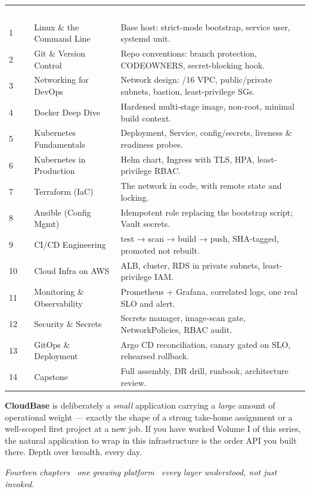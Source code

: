 \begin{center}\footnotesize
\wbrowcolors
\begin{tabularx}{\linewidth}{@{}C{7mm}L{38mm}X@{}}
\textcolor{white}{\textbf{Day}} & \textcolor{white}{\textbf{Topic}} & \textcolor{white}{\textbf{CloudBase milestone you build}}\\
1 & Linux \& the Command Line & Base host: strict-mode bootstrap, service user, systemd unit.\\
2 & Git \& Version Control & Repo conventions: branch protection, CODEOWNERS, secret-blocking hook.\\
3 & Networking for DevOps & Network design: /16 VPC, public/private subnets, bastion, least-privilege SGs.\\
4 & Docker Deep Dive & Hardened multi-stage image, non-root, minimal build context.\\
5 & Kubernetes Fundamentals & Deployment, Service, config/secrets, liveness \& readiness probes.\\
6 & Kubernetes in Production & Helm chart, Ingress with TLS, HPA, least-privilege RBAC.\\
7 & Terraform (IaC) & The network in code, with remote state and locking.\\
8 & Ansible (Config Mgmt) & Idempotent role replacing the bootstrap script; Vault secrets.\\
9 & CI/CD Engineering & test → scan → build → push, SHA-tagged, promoted not rebuilt.\\
10 & Cloud Infra on AWS & ALB, cluster, RDS in private subnets, least-privilege IAM.\\
11 & Monitoring \& Observability & Prometheus + Grafana, correlated logs, one real SLO and alert.\\
12 & Security \& Secrets & Secrets manager, image-scan gate, NetworkPolicies, RBAC audit.\\
13 & GitOps \& Deployment & Argo CD reconciliation, canary gated on SLO, rehearsed rollback.\\
14 & Capstone & Full assembly, DR drill, runbook, architecture review.\\
\end{tabularx}
\end{center}

\begin{keyidea}
\textbf{CloudBase} is deliberately a \emph{small} application carrying a \emph{large} amount of operational
weight --- exactly the shape of a strong take-home assignment or a well-scoped first project at a new job.
If you have worked Volume I of this series, the natural application to wrap in this infrastructure is the
order API you built there. Depth over breadth, every day.
\end{keyidea}

\clearpage
\vspace{1mm}
{\hypersetup{linkcolor=cInk}%
 \makeatletter{}\makeatother}
\vfill
\begin{center}\footnotesize\itshape\color{cInk!60}
Fourteen chapters \textbullet\ one growing platform \textbullet\ every layer understood, not just invoked.
\end{center}
\clearpage
